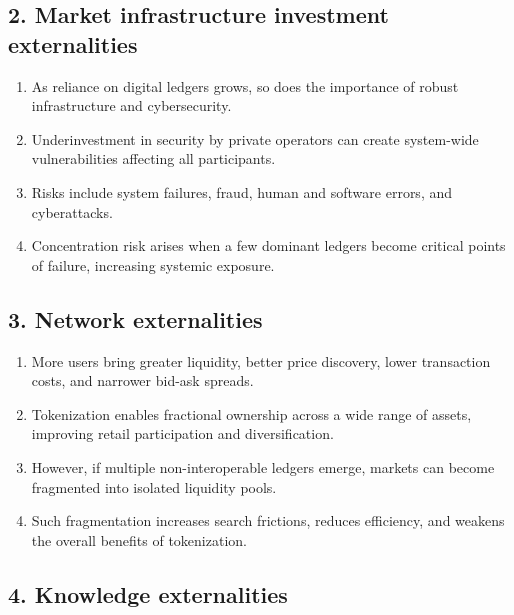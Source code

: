 \subsection*{2. Market infrastructure investment externalities}

\begin{enumerate}[label=\textbf{\alph*)}]
\item As reliance on digital ledgers grows, so does the importance of robust infrastructure
and cybersecurity.
\item Underinvestment in security by private operators can create system-wide vulnerabilities
affecting all participants.
\item Risks include system failures, fraud, human and software errors, and cyberattacks.
\item Concentration risk arises when a few dominant ledgers become critical points of failure,
increasing systemic exposure.
\end{enumerate}

\subsection*{3. Network externalities}

\begin{enumerate}[label=\textbf{\alph*)}]
\item More users bring greater liquidity, better price discovery, lower transaction costs, and
narrower bid-ask spreads.
\item Tokenization enables fractional ownership across a wide range of assets, improving retail
participation and diversification.
\item However, if multiple non-interoperable ledgers emerge, markets can become fragmented into
isolated liquidity pools.
\item Such fragmentation increases search frictions, reduces efficiency, and weakens the
overall benefits of tokenization.
\end{enumerate}

\subsection*{4. Knowledge externalities}

